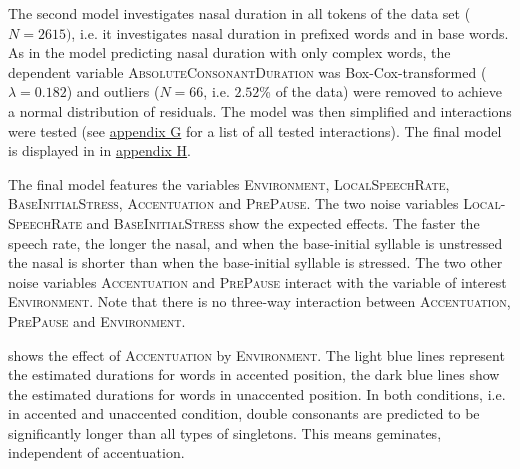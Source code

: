 The second model investigates nasal duration in all tokens of the data set ($N=2615)$, i.e. it investigates nasal duration in prefixed words and in base words. 
As in the model predicting nasal duration with only complex words, the dependent variable \textsc{AbsoluteConsonantDuration} was Box-Cox-transformed ($\lambda= 0.182$) and outliers ($N=66$, i.e. $ 2.52$\% of the data) were removed to achieve a normal distribution of residuals. The model was then simplified and interactions were tested (see \hyperref[Appendix G Summaries of tested interactions in experimental study]{appendix G} for a list of all tested interactions). The final model is displayed in  in \hyperref[Appendix H: Model Summaries Experiment]{appendix H}.


The final model features the variables \textsc{Environment}, \textsc{LocalSpeechRate}, \textsc{BaseInitialStress}, \textsc{Accentuation} and \textsc{PrePause}.
The two noise variables \textsc{Local-SpeechRate} and \textsc{BaseInitialStress} show the expected effects. The faster the speech rate, the longer the nasal, and when the base-initial syllable is unstressed the nasal is shorter than when the base-initial syllable is stressed.
The two other noise variables \textsc{Accentuation} and \textsc{PrePause} interact with the variable of interest \textsc{Environment}. Note that there is no three-way interaction between  \textsc{Accentuation}, \textsc{PrePause} and \textsc{Environment}.

 shows the effect of \textsc{Accentuation} by \textsc{Environment}. The light blue lines represent the estimated durations for words  in accented position, the dark blue lines show the estimated durations for words in unaccented position. In both conditions, i.e. in accented and unaccented condition, double consonants are predicted to be significantly longer than all types of singletons. This means  geminates, independent of accentuation.

